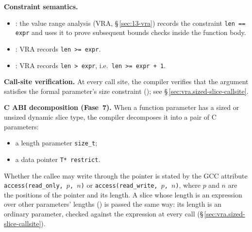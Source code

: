 \begin{example}
\end{example}

\pnum
\textbf{Constraint semantics.}
\begin{itemize}
  \item {}: the value range analysis (VRA, \S\,\ref{sec:13-vra})
        records the constraint \texttt{len == expr} and uses it to prove
        subsequent bounds checks inside the function body.
  \item {}: VRA records \texttt{len >= expr}.
  \item {}: VRA records \texttt{len > expr}, i.e.\ \texttt{len >= expr + 1}.
\end{itemize}

\pnum
\textbf{Call-site verification.}
At every call site, the compiler verifies that the argument satisfies the
formal parameter's size constraint (); see
\S\,\ref{sec:vra.sized-slice-callsite}.

\pnum
\textbf{C ABI decomposition (Fase~7).}
When a function parameter has a sized or unsized dynamic slice type, the
compiler decomposes it into a pair of C parameters:

\begin{itemize}
  \item a length parameter \texttt{size\_t};
  \item a data pointer \texttt{T* restrict}.
\end{itemize}

Whether the callee may write through the pointer is stated by the GCC attribute
\texttt{access(read\_only, $p$, $n$)} or \texttt{access(read\_write, $p$, $n$)}, where $p$ and
$n$ are the positions of the pointer and its length. A slice whose length is an expression over
other parameters' lengths () is passed the same way: its length is
an ordinary parameter, checked against the expression at every call
(\S\,\ref{sec:vra.sized-slice-callsite}).

